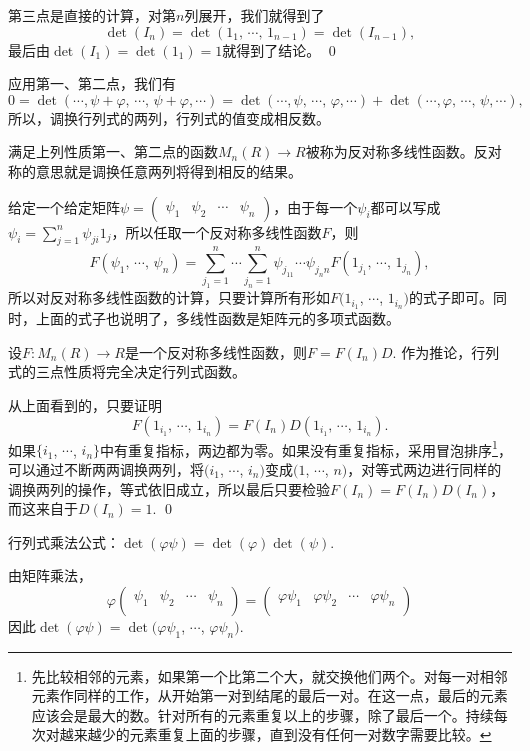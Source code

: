 	第三点是直接的计算，对第$n$列展开，我们就得到了
	\[
		\det(I_n)=\det(1_1,\,\cdots\!,\,1_{n-1})=\det(I_{n-1}),
	\]
	最后由$\det(I_1)=\det(1_1)=1$就得到了结论。
\qed

应用第一、第二点，我们有
\[
	0=\det(\cdots\!,\psi+\varphi,\,\cdots\!,\,\psi+\varphi,\cdots)=\det(\cdots\!,\psi,\,\cdots\!,\,\varphi,\cdots)+\det(\cdots\!,\varphi,\,\cdots\!,\,\psi,\cdots),
\]
所以，调换行列式的两列，行列式的值变成相反数。

满足上列性质第一、第二点的函数$M_n(R)\to R$被称为反对称多线性函数。反对称的意思就是调换任意两列将得到相反的结果。

\para 给定一个给定矩阵$\psi=\begin{pmatrix}\psi_{1} & \psi_{2} & \cdots & \psi_{n}\end{pmatrix}$，由于每一个$\psi_i$都可以写成$\psi_i=\sum_{j=1}^n\psi_{ji}1_j$，所以任取一个反对称多线性函数$F$，则
\[
	F(\psi_1,\,\cdots\!,\,\psi_n)=\sum_{j_1=1}^n\cdots \sum_{j_n=1}^n \psi_{j_11}\cdots \psi_{j_n n} F(1_{j_1},\,\cdots\!,\,1_{j_n}),
\]
所以对反对称多线性函数的计算，只要计算所有形如$F(1_{i_1}$, $\cdots$, $1_{i_n})$的式子即可。同时，上面的式子也说明了，多线性函数是矩阵元的多项式函数。

\pro 设$F:M_n(R)\to R$是一个反对称多线性函数，则$F=F(I_n)D$. 作为推论，行列式的三点性质将完全决定行列式函数。

\proof 
	从上面看到的，只要证明
	\[
		F(1_{i_1},\,\cdots\!,\,1_{i_n})=F(I_n)D(1_{i_1},\,\cdots\!,\,1_{i_n}).
	\]
	如果$\{i_1$, $\cdots$, $i_n\}$中有重复指标，两边都为零。如果没有重复指标，采用冒泡排序\footnote{先比较相邻的元素，如果第一个比第二个大，就交换他们两个。对每一对相邻元素作同样的工作，从开始第一对到结尾的最后一对。在这一点，最后的元素应该会是最大的数。针对所有的元素重复以上的步骤，除了最后一个。持续每次对越来越少的元素重复上面的步骤，直到没有任何一对数字需要比较。}，可以通过不断两两调换两列，将$(i_1$, $\cdots$, $i_n)$变成$(1$, $\cdots$, $n)$，对等式两边进行同样的调换两列的操作，等式依旧成立，所以最后只要检验$F(I_n)=F(I_n)D(I_n)$，而这来自于$D(I_n)=1$.
\qed

\pro 行列式乘法公式：$\det(\varphi \psi)=\det(\varphi)\det(\psi)$.

\proof 
	由矩阵乘法，
	\[
	\varphi
	\begin{pmatrix}
	\psi_{1} & \psi_{2} & \cdots & \psi_{n}\\
	\end{pmatrix}
	=
	\begin{pmatrix}
	\varphi\psi_{1} & \varphi\psi_{2} & \cdots & \varphi\psi_{n}\\
	\end{pmatrix}
	\]
	因此$\det (\varphi \psi)=\det (\varphi\psi_{1}$, $\cdots$, $\varphi\psi_{n})$.

